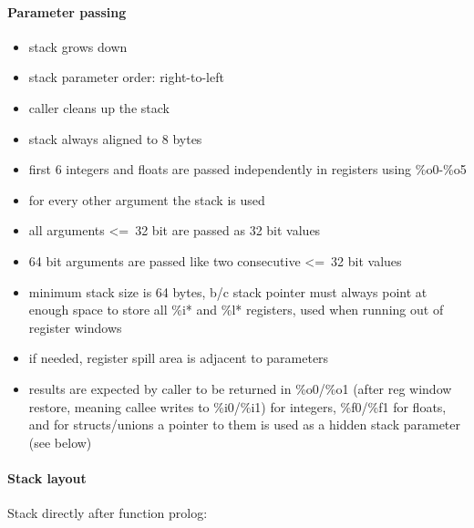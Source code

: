 \paragraph{Parameter passing}
\begin{itemize}
\item stack grows down
\item stack parameter order: right-to-left
\item caller cleans up the stack
\item stack always aligned to 8 bytes
\item first 6 integers and floats are passed independently in registers using \%o0-\%o5
\item for every other argument the stack is used
\item all arguments \textless=\ 32 bit are passed as 32 bit values
\item 64 bit arguments are passed like two consecutive \textless=\ 32 bit values
\item minimum stack size is 64 bytes, b/c stack pointer must always point at enough space to store all \%i* and \%l* registers, used when running out of register windows
\item if needed, register spill area is adjacent to parameters
\item results are expected by caller to be returned in \%o0/\%o1 (after reg window restore, meaning callee writes to \%i0/\%i1) for integers, \%f0/\%f1 for floats, and for structs/unions a pointer to them is used as a hidden stack parameter (see below)
\end{itemize}

\paragraph{Stack layout}

Stack directly after function prolog:\\


